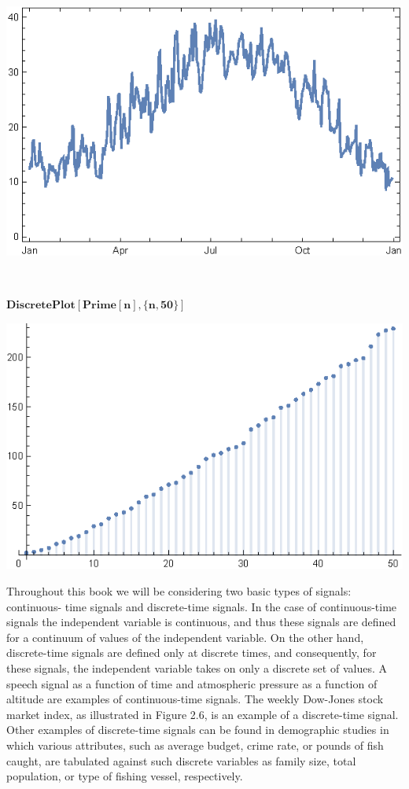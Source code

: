 \documentclass{report}
\begin{document}
\includegraphics{GhassaneAniba_Signals_Systems_Oppenheim_Chap1_gr3.eps}

\begin{doublespace}
\noindent\(\pmb{\text{}}\)
\end{doublespace}

\begin{doublespace}
\noindent\(\pmb{\text{DiscretePlot}[\text{Prime}[n],\{n,50\}]}\)
\end{doublespace}

\includegraphics{GhassaneAniba_Signals_Systems_Oppenheim_Chap1_gr4.eps}

Throughout this book we will be considering two basic types of signals: continuous- time signals and discrete-time signals. In the case of continuous-time
signals the independent variable is continuous, and thus these signals are defined for a continuum of values of the independent variable. On the
other hand, discrete-time signals are defined only at discrete times, and consequently, for these signals, the independent variable takes on only
a discrete set of values. A speech signal as a function of time and atmospheric pressure as a function of altitude are examples of continuous-time
signals. The weekly Dow-Jones stock market index, as illustrated in Figure 2.6, is an example of a discrete-time signal. Other examples of discrete-time
signals can be found in demographic studies in which various attributes, such as average budget, crime rate, or pounds of fish caught, are tabulated
against such discrete variables as family size, total population, or type of fishing vessel, respectively.
\end{document}
